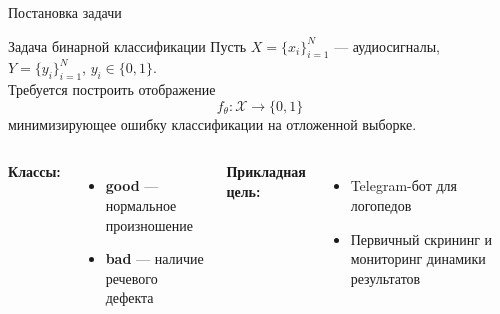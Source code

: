 \documentclass[aspectratio=169]{beamer}
\begin{document}
\begin{frame}{Постановка задачи}
  \begin{block}{Задача бинарной классификации}
    Пусть $X = \{x_i\}_{i=1}^{N}$ — аудиосигналы, $Y = \{y_i\}_{i=1}^{N}$, $y_i \in \{0,1\}$.\\[0.5em]
    Требуется построить отображение
    \[
      f_\theta : \mathcal{X} \rightarrow \{0, 1\}
    \]
    минимизирующее ошибку классификации на отложенной выборке.
  \end{block}

  \vspace{0.8em}
  \begin{columns}[T]
      \textbf{Классы:}
      \begin{itemize}
        \item \textbf{good} — нормальное произношение
        \item \textbf{bad} — наличие речевого дефекта
      \end{itemize}
      \textbf{Прикладная цель:}
      \begin{itemize}
        \item Telegram-бот для логопедов
        \item Первичный скрининг и мониторинг динамики результатов
      \end{itemize}
  \end{columns}
\end{frame}
\end{document}
